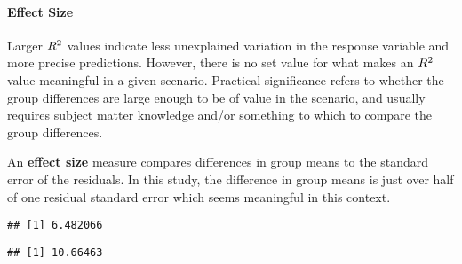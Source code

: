 \documentclass[
]{article}
\newenvironment{Shaded}{\begin{snugshade}}{\end{snugshade}}
\newcommand{\CommentTok}[1]{\textcolor[rgb]{0.56,0.35,0.01}{\textit{#1}}}
\newcommand{\DecValTok}[1]{\textcolor[rgb]{0.00,0.00,0.81}{#1}}
\newcommand{\FunctionTok}[1]{\textcolor[rgb]{0.00,0.00,0.00}{#1}}
\newcommand{\NormalTok}[1]{#1}
\newcommand{\OtherTok}[1]{\textcolor[rgb]{0.56,0.35,0.01}{#1}}
\newcommand{\SpecialCharTok}[1]{\textcolor[rgb]{0.00,0.00,0.00}{#1}}
\begin{document}
\hypertarget{effect-size}{%
\paragraph{Effect Size}\label{effect-size}}

Larger \(\small{R^2}\) values indicate less unexplained variation in the
response variable and more precise predictions. However, there is no set
value for what makes an \(\small{R^2}\) value meaningful in a given
scenario. Practical significance refers to whether the group differences
are large enough to be of value in the scenario, and usually requires
subject matter knowledge and/or something to which to compare the group
differences.

An \textbf{effect size} measure compares differences in group means to
the standard error of the residuals. In this study, the difference in
group means is just over half of one residual standard error which seems
meaningful in this context.

\begin{Shaded}
\end{Shaded}

\begin{verbatim}
## [1] 6.482066
\end{verbatim}

\begin{Shaded}
\end{Shaded}

\begin{verbatim}
## [1] 10.66463
\end{verbatim}
\end{document}
